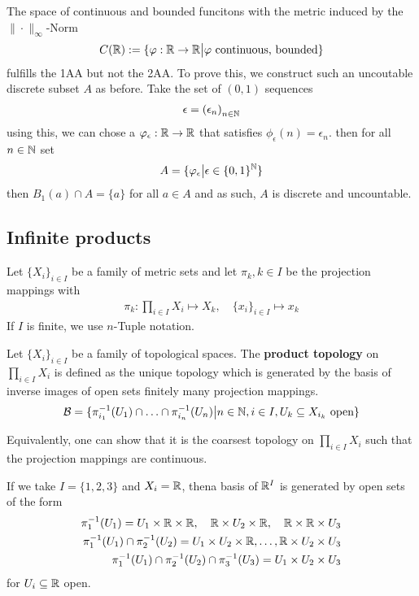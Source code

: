 \begin{ex}[]
  The space of continuous and bounded funcitons with the metric induced by the $\|\cdot\|_{\infty}$-Norm
  \begin{align*}
    C(\mathbb{R}) := \{\varphi:  \mathbb{R} \to \mathbb{R} \big\vert \varphi \text{ continuous, bounded}\}
  \end{align*}
  fulfills the 1AA but not the 2AA.
  To prove this, we construct such an uncoutable discrete subset $A$ as before. Take the set of $(0,1)$ sequences
  \begin{align*}
    \epsilon = \left(\epsilon_{n}\right)_{n \in \mathbb{N}}
  \end{align*}
  using this, we can chose a $\varphi_{\epsilon}: \mathbb{R} \to \mathbb{R}$ that satisfies $\phi_{\epsilon}(n) = \epsilon_n$.
  then for all $n \in \mathbb{N}$ set
  \begin{align*}
    A = \{\varphi_{\epsilon} \big\vert \epsilon \in \{0,1\}^{\mathbb{N}}\}
  \end{align*}
  then $B_1(a) \cap A = \{a\}$ for all $a \in A$ and as such, $A$ is discrete and uncountable.
\end{ex}



\subsection{Infinite products}
Let $\{X_i\}_{i \in I}$ be a family of metric sets and let $\pi_k, k \in I$ be the projection mappings with
\begin{align*}
  \pi_k: \prod_{i \in I}X_i \mapsto  X_k, \quad \{x_i\}_{i \in I} \mapsto  x_k
\end{align*}
If $I$ is finite, we use $n$-Tuple notation.


\begin{dfn}[]
Let $\{X_i\}_{i \in I}$ be a family of topological spaces.
The \textbf{product topology} on $\prod_{i \in I}X_i$ is defined as the unique topology which is generated by the basis of inverse images of open sets finitely many projection mappings.
  \begin{align*}
    \mathcal{B} = \{\pi_{i_1}^{-1}(U_1) \cap \ldots \cap \pi_{i_n}^{-1}(U_n) \big\vert n \in \mathbb{N}, i \in I, U_k \subseteq X_{i_k} \text{ open}\}
  \end{align*}
\end{dfn}
Equivalently, one can show that it is the coarsest topology on $\prod_{i \in I} X_i$ such that the projection mappings are continuous.

\begin{ex}[]
If we take $I = \{1,2,3\}$ and $X_i = \mathbb{R}$, thena basis of $\mathbb{R}^{I}$ is generated by open sets of the form
\begin{align*}
  \pi_1^{-1}(U_1) = U_1 \times \mathbb{R} \times \mathbb{R}, \quad
  \mathbb{R} \times U_2 \times \mathbb{R}, 
  \quad
  \mathbb{R} \times \mathbb{R} \times U_3\\
  \pi_1^{-1}(U_1) \cap \pi_2^{-1}(U_2) = U_1 \times U_2 \times \mathbb{R}, \ldots, \mathbb{R} \times U_2 \times U_3\\
  \pi_1^{-1}(U_1) \cap \pi_2^{-1}(U_2) \cap \pi_3^{-1}(U_3) = U_1 \times U_2 \times U_3
\end{align*}
for $U_i \subseteq \mathbb{R}$ open.
\end{ex}


